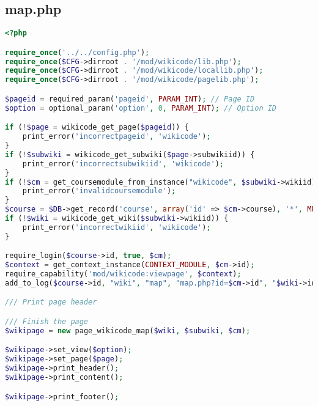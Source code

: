 \subsection{map.php}
\begin{lstlisting}[language=PHP]
<?php

require_once('../../config.php');
require_once($CFG->dirroot . '/mod/wikicode/lib.php');
require_once($CFG->dirroot . '/mod/wikicode/locallib.php');
require_once($CFG->dirroot . '/mod/wikicode/pagelib.php');

$pageid = required_param('pageid', PARAM_INT); // Page ID
$option = optional_param('option', 0, PARAM_INT); // Option ID

if (!$page = wikicode_get_page($pageid)) {
    print_error('incorrectpageid', 'wikicode');
}
if (!$subwiki = wikicode_get_subwiki($page->subwikiid)) {
    print_error('incorrectsubwikiid', 'wikicode');
}
if (!$cm = get_coursemodule_from_instance("wikicode", $subwiki->wikiid)) {
    print_error('invalidcoursemodule');
}
$course = $DB->get_record('course', array('id' => $cm->course), '*', MUST_EXIST);
if (!$wiki = wikicode_get_wiki($subwiki->wikiid)) {
    print_error('incorrectwikiid', 'wikicode');
}

require_login($course->id, true, $cm);
$context = get_context_instance(CONTEXT_MODULE, $cm->id);
require_capability('mod/wikicode:viewpage', $context);
add_to_log($course->id, "wiki", "map", "map.php?id=$cm->id", "$wiki->id");

/// Print page header

/// Finish the page
$wikipage = new page_wikicode_map($wiki, $subwiki, $cm);

$wikipage->set_view($option);
$wikipage->set_page($page);
$wikipage->print_header();
$wikipage->print_content();

$wikipage->print_footer();
\end{lstlisting}

